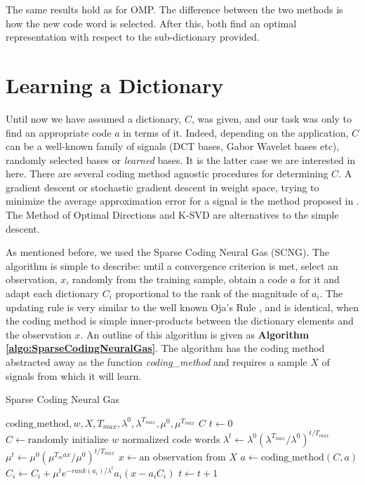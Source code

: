 \documentclass[runningheads,a4paper]{llncs}
\newcommand{\hcrange}[2]{\overline{{#1}\colon\!\!{#2}}}
\begin{document}
The same results hold as for OMP. The difference between the two methods is how the new code word is selected. After this, both find an optimal representation with respect to the sub-dictionary provided.

\section{Learning a Dictionary}

Until now we have assumed a dictionary, $C$, was given, and our task was only to find an appropriate code $a$ in terms of it. Indeed, depending on the application, $C$ can be a well-known family of signals (DCT bases, Gabor Wavelet bases \cite{LaBaMa08c} etc), randomly selected bases \cite{importanceencoding,randomweights} or \emph{learned} bases. It is the latter case we are interested in here. There are several coding method agnostic procedures for determining $C$. A gradient descent or stochastic gradient descent in weight space, trying to minimize the average approximation error for a signal is the method proposed in \cite{emergence,strategyv1}. The Method of Optimal Directions \cite{firstmod} and K-SVD \cite{firstksvd} are alternatives to the simple descent.

As mentioned before, we used the Sparse Coding Neural Gas (SCNG). The algorithm is simple to describe: until a convergence criterion is met, select an observation, $x$, randomly from the training sample, obtain a code $a$ for it and adapt each dictionary $C_i$ proportional to the rank of the magnitude of $a_i$. The updating rule is very similar to the well known Oja's Rule \cite{ojarule}, and is identical, when the coding method is simple inner-products between the dictionary elements and the observation $x$. An outline of this algorithm is given as \textbf{Algorithm \ref{algo:SparseCodingNeuralGas}}. The algorithm has the coding method abstracted away as the function \emph{coding\_method} and requires a sample $X$ of signals from which it will learn.

\begin{algorithm}
\caption{Sparse Coding Neural Gas}
\label{algo:SparseCodingNeuralGas}
\begin{algorithmic}
\Require $\text{coding\_method},w,X,T_{max},\lambda^0,\lambda^{T_{max}},\mu^0,\mu^{T_{max}}$
\Ensure $C$
\State $t \gets 0$
\State $C \gets \text{randomly initialize $w$ normalized code words}$
\State $\lambda^t \gets \lambda^0 (\lambda^{T_{max}} / \lambda^0)^{t / T_{max}}$
\State $\mu^t \gets \mu^0 (\mu^{T_max} / \mu^0)^{t / T_{max}}$
\State $x \gets \text{an observation from $X$}$
\State $a \gets \text{coding\_method}(C,a)$
\For {$i = \hcrange{1}{w}$}
\State $C_i \gets C_i + \mu^t e^{-rank(a_i) / \lambda^t} a_i (x - a_i C_i)$
\EndFor
\State $t \gets t + 1$
\EndWhile
\end{algorithmic}
\end{algorithm}
\end{document}
